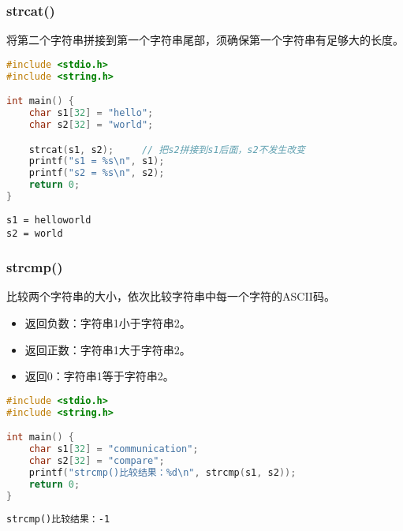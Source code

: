 \subsubsection{strcat()}

将第二个字符串拼接到第一个字符串尾部，须确保第一个字符串有足够大的长度。\\


\begin{lstlisting}[language=C]
#include <stdio.h>
#include <string.h>

int main() {
	char s1[32] = "hello";
	char s2[32] = "world";

	strcat(s1, s2);     // 把s2拼接到s1后面，s2不发生改变
	printf("s1 = %s\n", s1);
	printf("s2 = %s\n", s2);
	return 0;
}
\end{lstlisting}

\begin{tcolorbox}
	\begin{verbatim}
s1 = helloworld
s2 = world
	\end{verbatim}
\end{tcolorbox}

\subsubsection{strcmp()}

比较两个字符串的大小，依次比较字符串中每一个字符的ASCII码。

\begin{itemize}
	\item 返回负数：字符串1小于字符串2。
	\item 返回正数：字符串1大于字符串2。
	\item 返回0：字符串1等于字符串2。
\end{itemize}


\begin{lstlisting}[language=C]
#include <stdio.h>
#include <string.h>

int main() {
	char s1[32] = "communication";
	char s2[32] = "compare";
	printf("strcmp()比较结果：%d\n", strcmp(s1, s2));
	return 0;
}
\end{lstlisting}

\begin{tcolorbox}
	\begin{verbatim}
strcmp()比较结果：-1
	\end{verbatim}
\end{tcolorbox}

